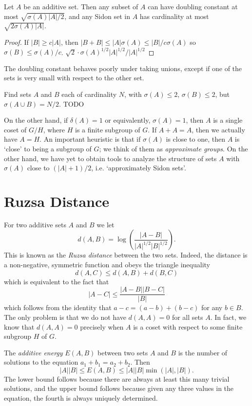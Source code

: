 \begin{theorem}
    Let $A$ be an additive set. Then any subset of $A$ can have doubling constant at most $\sqrt{\sigma(A)|A|/2}$, and any Sidon set in $A$ has cardinality at most $\sqrt{2\sigma(A) |A|}$.
\end{theorem}
\begin{proof}
    If $|B| \geq c |A|$, then $|B + B| \leq |A| \sigma(A) \leq |B|/c \sigma(A)$ so $\sigma(B) \leq \sigma(A)/c$. $\sqrt{2} \cdot \sigma(A)^{1/2} |A|^{1/2}/|A|^{1/2}$
\end{proof}

The doubling constant behaves poorly under taking unions, except if one of the sets is very small with respect to the other set.

\begin{example}
    Find sets $A$ and $B$ each of cardinality $N$, with $\sigma(A) \leq 2$, $\sigma(B) \leq 2$, but $\sigma(A \cup B) = N/2$. TODO
\end{example}

On the other hand, if $\delta(A) = 1$ or equivalently, $\sigma(A) = 1$, then $A$ is a single coset of $G/H$, where $H$ is a finite subgroup of $G$. If $A + A = A$, then we actually have $A = H$. An important heuristic is that if $\sigma(A)$ is close to one, then $A$ is `close' to being a subgroup of $G$; we think of them as \emph{approximate groups}. On the other hand, we have yet to obtain tools to analyze the structure of sets $A$ with $\sigma(A)$ close to $(|A| + 1)/2$, i.e. `approximately Sidon sets'.

\section{Ruzsa Distance}

For two additive sets $A$ and $B$ we let
%
\[ d(A,B) = \log \left( \frac{|A-B|}{|A|^{1/2}|B|^{1/2}} \right). \]
%
This is known as the \emph{Ruzsa distance} between the two sets. Indeed, the distance is a non-negative, symmetric function and obeys the triangle inequality
%
\[ d(A,C) \leq d(A,B) + d(B,C) \]
%
which is equivalent to the fact that
%
\[ |A-C| \leq \frac{|A-B||B-C|}{|B|} \]
%
which follows from the identity that $a - c = (a - b) + (b - c)$ for any $b \in B$. The only problem is that we do not have $d(A,A) = 0$ for all sets $A$. In fact, we know that $d(A,A) = 0$ precisely when $A$ is a coset with respect to some finite subgroup $H$ of $G$.

The \emph{additive energy} $E(A,B)$ between two sets $A$ and $B$ is the number of solutions to the equation $a_1 + b_1 = a_2 + b_2$. Then
%
\[ |A||B| \leq E(A,B) \leq |A| |B| \min(|A|,|B|). \]
%
The lower bound follows because there are always at least this many trivial solutions, and the upper bound follows because given any three values in the equation, the fourth is always uniquely determined.

